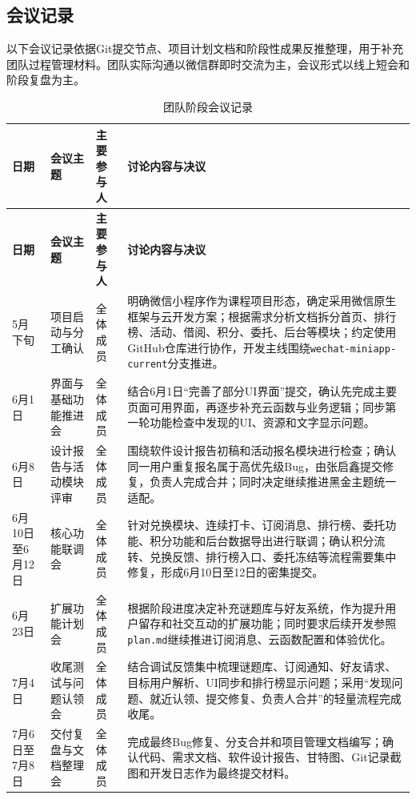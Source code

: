 \documentclass[a4paper,12pt]{article}
\begin{document}
\subsection{会议记录}

以下会议记录依据Git提交节点、项目计划文档和阶段性成果反推整理，用于补充团队过程管理材料。团队实际沟通以微信群即时交流为主，会议形式以线上短会和阶段复盘为主。

\begingroup
\renewcommand{\arraystretch}{1.25}
\setlength{\tabcolsep}{5pt}
\begin{longtable}{|>{\raggedright\arraybackslash}p{2.0cm}|>{\raggedright\arraybackslash}p{2.3cm}|>{\raggedright\arraybackslash}p{3.0cm}|>{\raggedright\arraybackslash}p{5.2cm}|}
\caption{团队阶段会议记录}\\
\hline
\rowcolor{gray!18}
\textbf{日期} & \textbf{会议主题} & \textbf{主要参与人} & \textbf{讨论内容与决议} \\
\hline
\endfirsthead
\hline
\rowcolor{gray!18}
\textbf{日期} & \textbf{会议主题} & \textbf{主要参与人} & \textbf{讨论内容与决议} \\
\hline
\endhead
5月下旬 & 项目启动与分工确认 & 全体成员 & 明确微信小程序作为课程项目形态，确定采用微信原生框架与云开发方案；根据需求分析文档拆分首页、排行榜、活动、借阅、积分、委托、后台等模块；约定使用GitHub仓库进行协作，开发主线围绕\texttt{wechat-miniapp-current}分支推进。\\ \hline
6月1日 & 界面与基础功能推进会 & 全体成员 & 结合6月1日“完善了部分UI界面”提交，确认先完成主要页面可用界面，再逐步补充云函数与业务逻辑；同步第一轮功能检查中发现的UI、资源和文字显示问题。\\ \hline
6月8日 & 设计报告与活动模块评审 & 全体成员 & 围绕软件设计报告初稿和活动报名模块进行检查；确认同一用户重复报名属于高优先级Bug，由张启鑫提交修复，负责人完成合并；同时决定继续推进黑金主题统一适配。\\ \hline
6月10日至6月12日 & 核心功能联调会 & 全体成员 & 针对兑换模块、连续打卡、订阅消息、排行榜、委托功能、积分功能和后台数据导出进行联调；确认积分流转、兑换反馈、排行榜入口、委托冻结等流程需要集中修复，形成6月10日至12日的密集提交。\\ \hline
6月23日 & 扩展功能计划会 & 全体成员 & 根据阶段进度决定补充谜题库与好友系统，作为提升用户留存和社交互动的扩展功能；同时要求后续开发参照\texttt{plan.md}继续推进订阅消息、云函数配置和体验优化。\\ \hline
7月4日 & 收尾测试与问题认领会 & 全体成员 & 结合调试反馈集中梳理谜题库、订阅通知、好友请求、目标用户解析、UI同步和排行榜显示问题；采用“发现问题、就近认领、提交修复、负责人合并”的轻量流程完成收尾。\\ \hline
7月6日至7月8日 & 交付复盘与文档整理会 & 全体成员 & 完成最终Bug修复、分支合并和项目管理文档编写；确认代码、需求文档、软件设计报告、甘特图、Git记录截图和开发日志作为最终提交材料。\\
\hline
\end{longtable}
\endgroup
\end{document}
